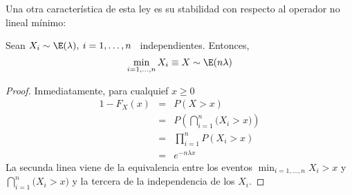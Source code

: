 Una otra caracter\'istica de esta ley  es su stabilidad con respecto al operador
no lineal m\'inimo:
%
\begin{lema}
\label{Lem:MP:StabilidadExponencialMinimo}
%
  Sean  $X_i \sim \E(\lambda), \: i = 1, \ldots , n$ \  independientes. Entonces,
  \[
  \min_{i=1,\ldots,n} X_i \equiv X \sim \E(n \lambda)
  \]
\end{lema}
%
\begin{proof}
Inmediatamente, para cualquief $x \ge 0$
%
\begin{eqnarray*}
1-F_X(x) & = & P(X > x) \\[2mm]
%
& = & P\left( \bigcap_{i=1}^n \big( X_i > x \big) \right)\\[2mm]
%
& = & \prod_{i=1}^n P(X_i > x)\\[2mm]
%
& = & e^{- n \lambda x}
\end{eqnarray*}
%
La   secunda   linea   viene   de   la  equivalencia   entre   los   eventos   $
\min_{i=1,\ldots,n}  X_i >  x$ y  $\bigcap_{i=1}^n  \big( X_i  > x  \big)$ y  la
tercera de la independencia de los $X_i$.
\end{proof}